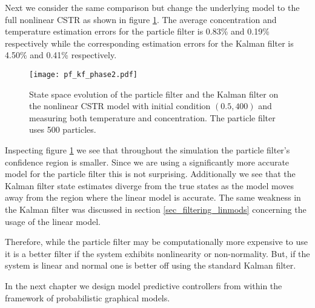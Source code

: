 Next we consider the same comparison but change the underlying model to the full nonlinear CSTR as shown in figure \ref{fig_pf_kf_phase2}. The average concentration and temperature estimation errors for the particle filter is 0.83\% and 0.19\% respectively while the corresponding estimation errors for the Kalman filter is 4.50\% and 0.41\% respectively.
\begin{figure}[H] 
\centering
\texttt{[image: pf\_kf\_phase2.pdf]}
\caption{State space evolution of the particle filter and the Kalman filter on the nonlinear CSTR model with initial condition $(0.5, 400)$ and measuring both temperature and concentration. The particle filter uses 500 particles.}
\label{fig_pf_kf_phase2}
\end{figure}
Inspecting figure \ref{fig_pf_kf_phase2} we see that throughout the simulation the particle filter's confidence region is smaller. Since we are using a significantly more accurate model for the particle filter this is not surprising. Additionally we see that the Kalman filter state estimates diverge from the true states as the model moves away from the region where the linear model is accurate. The same weakness in the Kalman filter was discussed in section \ref{sec_filtering_linmods} concerning the usage of the linear model.

Therefore, while the particle filter may be computationally more expensive to use it is a better filter if the system exhibits nonlinearity or non-normality. But, if the system is linear and normal one is better off using the standard Kalman filter.

In the next chapter we design model predictive controllers from within the framework of probabilistic graphical models.